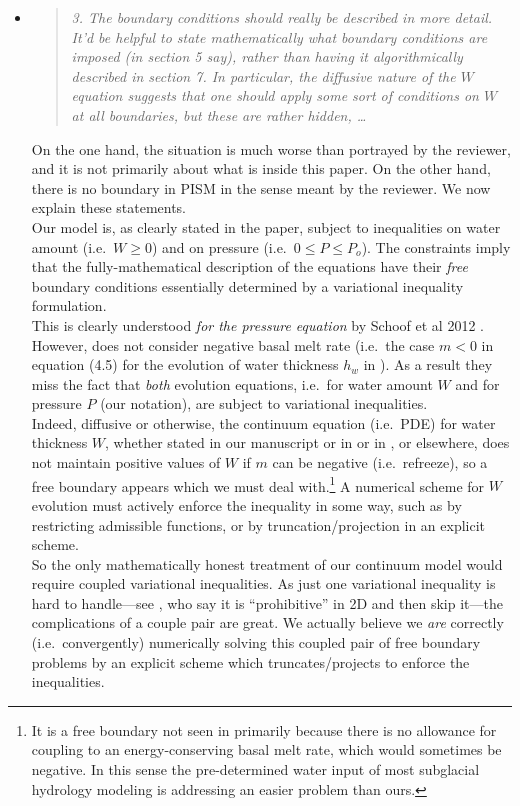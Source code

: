 \documentclass[11pt,reqno]{amsart}
\newcommand{\reply}[2]{
\medskip\medskip
\item  \begin{quote}
\emph{#1}
\end{quote}

\medskip
\noindent #2}
\begin{document}
\begin{itemize}
\reply{3. The boundary conditions should really be described in more detail.  It'd be helpful to state mathematically what boundary conditions are imposed (in section 5 say), rather than having it algorithmically described in section 7.  In particular, the diffusive nature of the $W$ equation suggests that one should apply some sort of conditions on $W$ at all boundaries, but these are rather hidden, \dots}
{On the one hand, the situation is much worse than portrayed by the reviewer, and it is not primarily about what is inside this paper.  On the other hand, there is no boundary in PISM in the sense meant by the reviewer.  We now explain these statements.\\
\indent Our model is, as clearly stated in the paper, subject to inequalities on water amount (i.e.~$W\ge 0$) and on pressure (i.e.~$0\le P \le P_o$).  The constraints imply that the fully-mathematical description of the equations have their \emph{free} boundary conditions essentially determined by a variational inequality formulation.\\
\indent This is clearly understood \emph{for the pressure equation} by Schoof et al 2012 \cite{Schoofetal2012}.  However, \cite{Schoofetal2012} does not consider negative basal melt rate (i.e.~the case $m<0$ in equation (4.5) for the evolution of water thickness $h_w$ in \cite{Schoofetal2012}).  As a result they miss the fact that \emph{both} evolution equations, i.e.~for water amount $W$ and for pressure $P$ (our notation), are subject to variational inequalities.  \\
\indent Indeed, diffusive or otherwise, the continuum equation (i.e.~PDE) for water thickness $W$, whether stated in our manuscript or in \cite{Schoofetal2012} or in \cite{Hewitt2011}, or elsewhere, does not maintain positive values of $W$ if $m$ can be negative (i.e.~refreeze), so a free boundary appears which we must deal with.\footnote{It is a free boundary not seen in \cite{Schoofetal2012} primarily because there is no allowance for coupling to an energy-conserving basal melt rate, which would sometimes be negative.  In this sense the pre-determined water input of most subglacial hydrology modeling is addressing an easier problem than ours.}  A numerical scheme for $W$ evolution must actively enforce the inequality in some way, such as by restricting admissible functions, or by truncation/projection in an explicit scheme. \\
\indent So the only mathematically honest treatment of our continuum model would require coupled variational inequalities.  As just one variational inequality is hard to handle---see \cite{Werderetal2013}, who say it is ``prohibitive'' in 2D and then skip it---the complications of a couple pair are great.  We actually believe we \emph{are} correctly (i.e.~convergently) numerically solving this coupled pair of free boundary problems by an explicit scheme which truncates/projects to enforce the inequalities.\\
}
\end{itemize}
\end{document}
